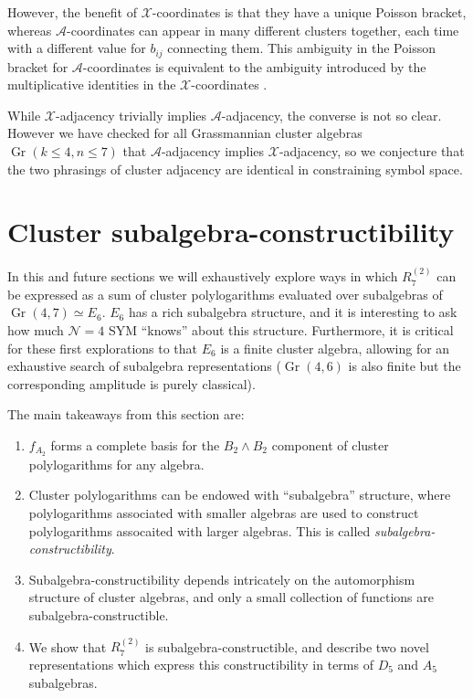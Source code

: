 \documentclass[11pt]{article}
\DeclareMathOperator{\Gr}{Gr}
\def\x{\mathcal{X}}
\def\xcoords{$\mathcal{X}$-coordinates }
\def\a{\mathcal{A}}
\def\acoords{$\mathcal{A}$-coordinates }
\def\flag{{\huge \color{red} \textinterrobang}}
\begin{document}
However, the benefit of \xcoords is that they have a unique Poisson bracket, whereas \acoords can appear in many different clusters together, each time with a different value for $b_{ij}$ connecting them. This ambiguity in the Poisson bracket for \acoords is equivalent to the ambiguity introduced by the multiplicative identities in the \xcoords.  

While $\x$-adjacency trivially implies $\a$-adjacency, the converse is not so clear. However we have checked for all Grassmannian cluster algebras $\Gr(k\le4,n\le7)$ that $\a$-adjacency implies $\x$-adjacency, so we conjecture that the two phrasings of cluster adjacency are identical in constraining symbol space. \flag

\section{Cluster subalgebra-constructibility}\label{sec:sub-constructibility} 

In this and future sections we will exhaustively explore ways in which $R^{(2)}_{7}$ can be expressed as a sum of cluster polylogarithms evaluated over subalgebras of $\Gr(4,7) \simeq E_6$. $E_6$ has a rich subalgebra structure, and it is interesting to ask how much $\mathcal{N}=4$ SYM ``knows'' about this structure. Furthermore, it is critical for these first explorations to that $E_6$ is a finite cluster algebra, allowing for an exhaustive search of subalgebra representations ($\Gr(4,6)$ is also finite but the corresponding amplitude is purely classical).

The main takeaways from this section are:
\begin{enumerate}
	\item $f_{A_2}$ forms a complete basis for the $B_2 \wedge B_2$ component of cluster polylogarithms for any algebra. 
	\item Cluster polylogarithms can be endowed with ``subalgebra'' structure, where polylogarithms associated with smaller algebras are used to construct polylogarithms assocaited with larger algebras. This is called \emph{subalgebra-constructibility}.
	\item Subalgebra-constructibility depends intricately on the automorphism structure of cluster algebras, and only a small collection of functions are subalgebra-constructible. 
	\item We show that $R^{(2)}_7$ is subalgebra-constructible, and describe two novel representations which express this constructibility in terms of $D_5$ and $A_5$ subalgebras. 
\end{enumerate}
\end{document}
